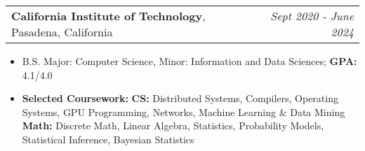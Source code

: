 \documentclass[letterpaper,11pt]{article}
\makeatletter
\newcommand{\resitem}[1]{\item[--] #1}
\newcommand{\edusubheading}[3]{
	\vspace{3pt}
	\begin{tabular*}{7.5in}{l@{\extracolsep{\fill}}r}
		\textbf{#1}, #2 & \textit{#3} \\
	\end{tabular*}
	}
\makeatother
\begin{document}

\edusubheading{California Institute of Technology}
{Pasadena, California}
{Sept 2020 - June 2024}
\begin{itemize}
	\resitem{
		B.S. Major: Computer Science,
		Minor: Information and Data Sciences;
		\textbf{GPA:} 4.1/4.0
	}
	\resitem{
		\textbf{Selected Coursework:}
		\textbf{CS:}
		Distributed Systems,
		Compilers,
		Operating Systems,
		GPU Programming,
		Networks,
		Machine Learning \& Data Mining
		\textbf{Math:}
		Discrete Math,
		Linear Algebra,
		Statistics,
		Probability Models,
		Statistical Inference,
		Bayesian Statistics
	}
\end{itemize}

\end{document}
